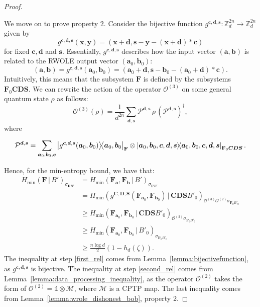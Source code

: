 \begin{proof}
\

We move on to prove property $2$. Consider the bijective function $g^{\bm{c},\bm{d},\bm{s}} : \mathbb{Z}^{2n}_d \rightarrow \mathbb{Z}^{2n}_d$ given by 
$$g^{\bm{c},\bm{d},\bm{s}}(\bm{x}, \bm{y}) = (\bm{x} + \bm{d}, \bm{s} - \bm{y} - (\bm{x} + \bm{d}) * \bm{c})$$
for fixed $\bm{c}, \bm{d}$ and $\bm{s}$. Essentially, $g^{\bm{c},\bm{d},\bm{s}}$ describes how the input vector $(\bm{a}, \bm{b})$ is related to the RWOLE output vector $(\bm{a}_0, \bm{b}_0)$:
\begin{equation}
\label{eq:def_ab}
    (\bm{a}, \bm{b}) = g^{\bm{c},\bm{d},\bm{s}}(\bm{a}_0, \bm{b}_0) = (\bm{a}_0 + \bm{d}, \bm{s} - \bm{b}_0 - (\bm{a}_0 + \bm{d})  * \bm{c}).
\end{equation}
Intuitively, this means that the subsystem $\mathbf{F}$ is defined by the subsystems $\mathbf{F}_0 \mathbf{C} \mathbf{D} \mathbf{S}$. We can rewrite  the action of the operator $\mathcal{O}^{(3)}$  on some general quantum state $\rho$ as follows:
\begin{equation*}
    \mathcal{O}^{(3)}(\rho) = \frac{1}{d^{2n}} \sum_{\bm{d}, \bm{s}} \mathcal{P}^{\bm{d}, \bm{s}}\, \rho \, (\mathcal{P}^{\bm{d}, \bm{s} })^\dagger,
\end{equation*}
where 
\begin{small}
\begin{equation}
\mathcal{P}^{\bm{d}, \bm{s}} = \sum_{\bm{a}_0, \bm{b}_0, \bm{c}} \ketbra{g^{\bm{c},\bm{d},\bm{s}}(\bm{a}_0, \bm{b}_0)}{\bm{a}_0, \bm{b}_0}_{\mathbf{F}} \otimes \ketbra{\bm{a}_0, \bm{b}_0, \bm{c}, \bm{d}, \bm{s}}_{\mathbf{F}_0 \bm{C} \bm{D} \bm{S}}. \nonumber
\end{equation}
\end{small}


Hence, for the min-entropy bound,  we have that:
\begin{align}
H_{\min}(\mathbf{F} \,|\, B')_{\sigma_{\mathbf{F}B'}} &= H_{\min}(\mathbf{F}_{\bm{a}}, \mathbf{F}_{\bm{b}} \,|\, B')_{\sigma_{\mathbf{F}B'}} \nonumber\\
&=H_{\min}( g^{\bm{C},\bm{D},\bm{S}}(\mathbf{F}_{\bm{a}_0}, \mathbf{F}_{\bm{b}_0} )  \,|\, \mathbf{C} \mathbf{D} \mathbf{S} B'_0)_{\mathcal{O}^{(3)} \mathcal{O}^{(2)}\sigma_{\mathbf{F}_0B'_0}} \nonumber\\
&\geq H_{\min}(\mathbf{F}_{\bm{a}_0}, \mathbf{F}_{\bm{b}_0} \,|\, \mathbf{C} \mathbf{D} \mathbf{S} B'_0)_{ \mathcal{O}^{(2)}\sigma_{\mathbf{F}_0B'_0}} \label{first_rel} \\
&\geq H_{\min}(\mathbf{F}_{\bm{a}_0}, \mathbf{F}_{\bm{b}_0} \,|\, B'_0)_{\sigma_{\mathbf{F}_0B'_0}} \label{second_rel}\\
&\geq \frac{n\log d}{2}(1 - h_d(\zeta)). \label{third_rel}
\end{align}
The inequality at step \eqref{first_rel} comes from Lemma~\ref{lemma:bijectivefunction},  as $g^{\bm{c},\bm{d},\bm{s}}$ is bijective. The inequality at step \eqref{second_rel} comes from Lemma~\ref{lemma:data_processing_inequality}, as the operator $\mathcal{O}^{(2)}$ takes the form of $\mathcal{O}^{(2)} = \mathds{1} \otimes \mathcal{M}$, where $\mathcal{M}$ is a CPTP map. The last inequality comes from Lemma~\ref{lemma:wrole_dishonest_bob}, property 2.


\end{proof}
